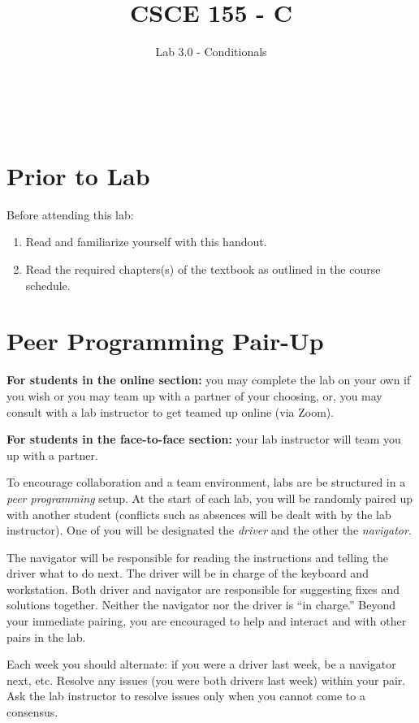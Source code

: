 \documentclass[12pt]{scrartcl}
\title{CSCE 155 - C}
\subtitle{Lab 3.0 - Conditionals}
\author{~}
\date{~}
\begin{document}
\maketitle

\section*{Prior to Lab}

Before attending this lab:
\begin{enumerate}
  \item Read and familiarize yourself with this handout.
  \item Read the required chapters(s) of the textbook as 
  outlined in the course schedule.
\end{enumerate}

\section*{Peer Programming Pair-Up}

\textbf{For students in the online section:} you may complete
the lab on your own if you wish or you may team up with a partner
of your choosing, or, you may consult with a lab instructor to get
teamed up online (via Zoom).

\textbf{For students in the face-to-face section:} your
lab instructor will team you up with a partner.  

To encourage collaboration and a team environment, labs are be
structured in a \emph{peer programming} setup.  At the start of
each lab, you will be randomly paired up with another student 
(conflicts such as absences will be dealt with by the lab instructor).
One of you will be designated the \emph{driver} and the other
the \emph{navigator}.  

The navigator will be responsible for reading the instructions and
telling the driver what to do next.  The driver will be in charge of the
keyboard and workstation.  Both driver and navigator are responsible
for suggesting fixes and solutions together.  Neither the navigator
nor the driver is ``in charge.''  Beyond your immediate pairing, you
are encouraged to help and interact and with other pairs in the lab.

Each week you should alternate: if you were a driver last week, 
be a navigator next, etc.  Resolve any issues (you were both drivers
last week) within your pair.  Ask the lab instructor to resolve issues
only when you cannot come to a consensus.  
\end{document}
